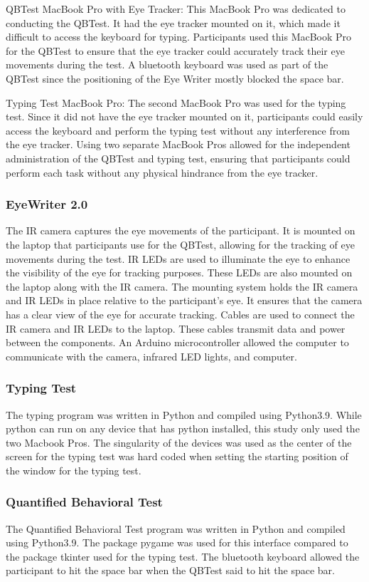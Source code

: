 \documentclass[manuscript, screen, review]{acmart} %
\begin{document}
QBTest MacBook Pro with Eye Tracker: This MacBook Pro was dedicated to conducting the QBTest. It had the eye tracker mounted on it, which made it difficult to access the keyboard for typing. Participants used this MacBook Pro for the QBTest to ensure that the eye tracker could accurately track their eye movements during the test. A bluetooth keyboard was used as part of the QBTest since the positioning of the Eye Writer mostly blocked the space bar.

Typing Test MacBook Pro: The second MacBook Pro was used for the typing test. Since it did not have the eye tracker mounted on it, participants could easily access the keyboard and perform the typing test without any interference from the eye tracker.
Using two separate MacBook Pros allowed for the independent administration of the QBTest and typing test, ensuring that participants could perform each task without any physical hindrance from the eye tracker.

\subsubsection{EyeWriter 2.0}
The IR camera captures the eye movements of the participant.
It is mounted on the laptop that participants use for the QBTest, allowing for the tracking of eye movements during the test.
IR LEDs are used to illuminate the eye to enhance the visibility of the eye for tracking purposes. 
These LEDs are also mounted on the laptop along with the IR camera. 
The mounting system holds the IR camera and IR LEDs in place relative to the participant's eye. 
It ensures that the camera has a clear view of the eye for accurate tracking. 
Cables are used to connect the IR camera and IR LEDs to the laptop. These cables transmit data and power between the components.
An Arduino microcontroller allowed the computer to communicate with the camera, infrared LED lights, and computer.

\subsubsection{Typing Test}
The typing program was written in Python and compiled using Python3.9. 
While python can run on any device that has python installed, this study only used the two Macbook Pros. 
The singularity of the devices was used as the center of the screen for the typing test was hard coded when setting the starting position of the window for the typing test. 

\subsubsection{Quantified Behavioral Test}
The Quantified Behavioral Test program was written in Python and compiled using Python3.9.
The package pygame was used for this interface compared to the package tkinter used for the typing test.
The bluetooth keyboard allowed the participant to hit the space bar when the QBTest said to hit the space bar.
\end{document}
